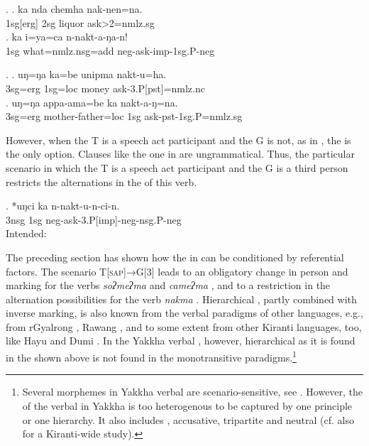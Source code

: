 	 \ex. \ag.  ka nda chemha nak-nen=na.\\
	{\sc 1sg[erg]} 	 {\sc 2sg}  liquor ask{>2=nmlz.sg}	\\
	 \bg. ka i=ya=ca n-nakt-a-ŋa-n!\\ 
	{\sc 1sg}  what{\sc =nmlz.nsg=add} {\sc neg-}ask{\sc -imp-1sg.P-neg}		\\ 
	    
	
\ex. \ag. uŋ=ŋa ka=be unipma nakt-u=ha.\\
		{\sc 3sg=erg} {\sc 1sg=loc}  money   ask{\sc -3.P[pst]=nmlz.nc}	\\
 	\bg. uŋ=ŋa appa-ama=be ka nakt-a-ŋ=na.\\
	{\sc 3sg=erg} mother-father{\sc =loc}  {\sc 1sg}	ask{\sc -pst-1sg.P=nmlz.sg}	\\

However, when the T is a speech act participant and the G is not, as in \Last[b], the  is the only option. Clauses like the one in \Next are ungrammatical. Thus, the particular scenario in which the T is a speech act participant and the G is a third person restricts the alternations in the  of this verb.

\exg. *uŋci ka n-nakt-u-n-ci-n.\\
	{\sc 3nsg} {\sc 1sg} {\sc neg-}ask{\sc -3.P[imp]-neg-nsg.P-neg}\\
	Intended:   


The preceding section has shown how the  in  can be conditioned by referential factors. The scenario  T[\textsc{sap}]→G[3]  leads to an obligatory change in  person and  marking for the verbs \emph{soʔmeʔma}  and \emph{cameʔma} , and to a restriction in the alternation possibilities for the verb \emph{nakma} . Hierarchical , partly combined with inverse marking, is also known from the verbal paradigms of other  languages, e.g., from rGyalrong \citep{Nagano1984A-historical}, Rawang \citep{LaPolla2007Hierarchical}, and to some extent from other Kiranti languages, too, like Hayu and Dumi \citep{Michailovsky2003Hayu, Driem1993A-grammar}. In the Yakkha verbal , however, hierarchical  as it is found in the  shown above is not found in the monotransitive paradigms.\footnote{Several morphemes in Yakkha verbal  are scenario-sensitive, see . However, the  of the verbal  in Yakkha is too heterogenous to be captured by one principle or one hierarchy. It also includes , accusative, tripartite and neutral  (cf. also \citealt{Witzlacketal2011_Decomposing} for a Kiranti-wide study).}


 